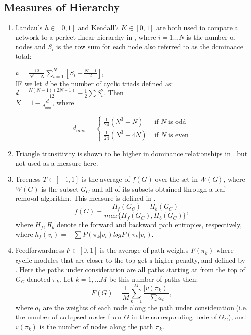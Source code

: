 \documentclass[3p,times]{elsarticle}
\begin{document}
\subsection{Measures of Hierarchy}
\begin{enumerate}
	\item Landau's $h\in[0,1]$ and Kendall's $K\in[0,1]$ are both used to compare a network to a perfect linear hierarchy in \cite{animals}, where $i=1...N$ is the number of nodes and $S_i$ is the row sum for each node also referred to as the dominance total: \\
	\begin{center}
		$h=\frac{12}{N^3-N}\sum_{i=1}^{N}{[S_i-\frac{N-1}{2}]}$, \\
		\vspace{5mm}
		IF we let $d$ be the number of cyclic triads defined as: $d=\frac{N(N-1)(2N-1)}{12}-\frac{1}{2}\sum{S_i^2}$. Then 
		\\ \vspace{5mm}
		$K=1-\frac{d}{d_{max}}$, where 
		
		$$
		d_{max} = \left\{ \begin{array}{rl}
		\frac{1}{24}(N^3-N)&\mbox{ if $N$ is odd} \\
		\frac{1}{24}(N^3-4N)&\mbox{ if $N$ is even}
		\end{array} \right.
		$$
	\end{center} 
	
	\item Triangle transitivity is shown to be higher in dominance relationships in \cite{animals}, but not used as a measure here.
	
	\item Treeness $T\in[-1,1]$ is the average of $f(G)$ over the set in $W(G)$, where $W(G)$ is the subset $G_C$ and all of its subsets obtained through a leaf removal algorithm. This measure is defined in \cite{3D}.
	$$
	f(G)=\frac{H_f(G_C)-H_b(G_C)}{max\{H_f(G_C),H_b(G_C)\}},
	$$
	where $H_f, H_b$ denote the forward and backward path entropies, respectively, where $h_f(v_i)=-\sum{P(\pi_k|v_i)logP(\pi_k|v_i)}$.  
	
	\item Feedforwardness $F\in[0,1]$ is the average of path weights $F(\pi_k)$ where cyclic modules that are closer to the top get a higher penalty, and defined by \cite{3D}. Here the paths under consideration are all paths starting at from the top of $G_C$ denoted $\pi_k$. Let $k=1,...M$ be this number of paths then:
	$$
	F(G)=\frac{1}{M}\sum_{k=1}^{M}{\frac{|v(\pi_k)|}{\sum{a_i}}},
	$$
	where $a_i$ are the weights of each node along the path under consideration (i.e. the number of collapsed nodes from $G$ in the corresponding node of $G_C$), and $v(\pi_k)$ is the number of nodes along the path $\pi_k$.
	

\end{enumerate}
\end{document}
